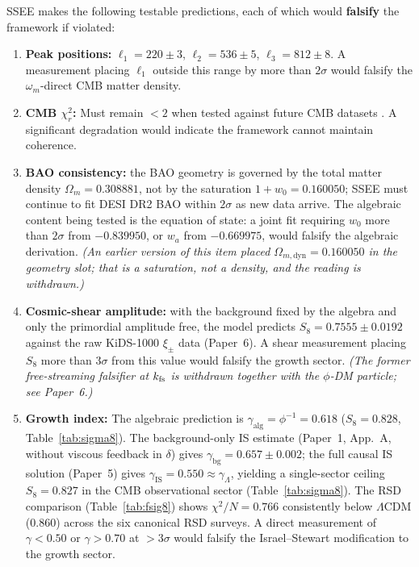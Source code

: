 \documentclass[12pt,a4paper]{article}
\begin{document}
SSEE makes the following testable predictions,
each of which would \textbf{falsify} the framework if violated:

\begin{enumerate}
  \item \textbf{Peak positions:} $\ell_1=220\pm3$, $\ell_2=536\pm5$, $\ell_3=812\pm8$.
    A measurement placing $\ell_1$ outside this range by more than $2\sigma$
    would falsify the $\omega_m$-direct CMB matter density.

  \item \textbf{CMB $\chi^2_r$:} Must remain $<2$ when tested against future
    CMB datasets \citep{CMBS4_2016,SimonsObs2019}. A significant degradation
    would indicate the framework cannot maintain coherence.

  \item \textbf{BAO consistency:} the BAO geometry is governed by the total
    matter density $\Omega_m=0.308881$, not by the saturation
    $1+w_0=0.160050$; SSEE must continue to fit DESI DR2 BAO within $2\sigma$
    as new data arrive. The algebraic content being tested is the
    equation of state: a joint fit requiring $w_0$ more than $2\sigma$
    from $-0.839950$, or $w_a$ from $-0.669975$, would falsify the
    algebraic derivation. \emph{(An earlier version of this item placed
    $\Omega_{m,\mathrm{dyn}}=0.160050$ in the geometry slot; that is a
    saturation, not a density, and the reading is withdrawn.)}

  \item \textbf{Cosmic-shear amplitude:} with the background fixed by the
    algebra and only the primordial amplitude free, the model predicts
    $S_8=0.7555\pm0.0192$ against the raw KiDS-1000 $\xi_\pm$ data (Paper~6).
    A shear measurement placing $S_8$ more than $3\sigma$ from this value
    would falsify the growth sector. \emph{(The former free-streaming
    falsifier at $k_{\rm fs}$ is withdrawn together with the $\phi$-DM
    particle; see Paper~6.)}

  \item \textbf{Growth index:} The algebraic prediction is $\gamma_\mathrm{alg}=\phi^{-1}=0.618$
    ($S_8=0.828$, Table~\ref{tab:sigma8}).
    The background-only IS estimate (Paper~1, App.~A, without viscous feedback in $\delta$)
    gives $\gamma_\mathrm{bg}=0.657\pm0.002$;
    the full causal IS solution (Paper~5) gives $\gamma_\mathrm{IS}=0.550\approx\gamma_\Lambda$,
    yielding a single-sector ceiling $S_8=0.827$ in the CMB observational sector (Table~\ref{tab:sigma8}).
    The RSD comparison (Table~\ref{tab:fsig8}) shows $\chi^2/N=0.766$
    consistently below $\Lambda$CDM (0.860) across the six canonical RSD surveys.
    A direct measurement of $\gamma<0.50$ or $\gamma>0.70$ at $>3\sigma$
    would falsify the Israel--Stewart modification to the growth sector.
\end{enumerate}
\end{document}
